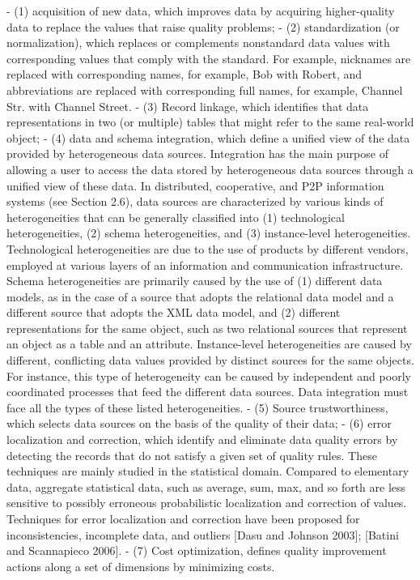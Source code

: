 \documentclass[pdftex,english,oribibl]{llncs}
\begin{document}
    - (1) acquisition of new data, which improves data by acquiring higher-quality data to replace the values that raise quality problems;
    - (2) standardization (or normalization), which replaces or complements nonstandard data values with corresponding values that comply with the standard. For example, nicknames are replaced with corresponding names, for example, Bob with Robert, and abbreviations are replaced with corresponding full names, for example, Channel Str. with Channel Street.
    - (3) Record linkage, which identifies that data representations in two (or multiple) tables that might refer to the same real-world object;
    - (4) data and schema integration, which define a unified view of the data provided by heterogeneous data sources. Integration has the main purpose of allowing a user to access the data stored by heterogeneous data sources through a unified view of these data. In distributed, cooperative, and P2P information systems (see Section 2.6), data sources are characterized by various kinds of heterogeneities that can be generally classified into (1) technological heterogeneities, (2) schema heterogeneities, and (3) instance-level heterogeneities. Technological heterogeneities are due to the use of products by different vendors, employed at various layers of an information and communication infrastructure. Schema heterogeneities are primarily caused by the use of (1) different data models, as in the case of a source that adopts the relational data model and a different source that adopts the XML data model, and (2) different representations for the same object, such as two relational sources that represent an object as a table and an attribute. Instance-level heterogeneities are caused by different, conflicting data values provided by distinct sources for the same objects. For instance, this type of heterogeneity can be caused by independent and poorly coordinated processes that feed the different data sources. Data integration must face all the types of these listed heterogeneities.
    - (5) Source trustworthiness, which selects data sources on the basis of the quality of their data;
    - (6) error localization and correction, which identify and eliminate data quality errors by detecting the records that do not satisfy a given set of quality rules. These techniques are mainly studied in the statistical domain. Compared to elementary data, aggregate statistical data, such as average, sum, max, and so forth are less sensitive to possibly erroneous probabilistic localization and correction of values. Techniques for error localization and correction have been proposed for inconsistencies, incomplete data, and outliers [Dasu and Johnson 2003]; [Batini and Scannapieco 2006].
    - (7) Cost optimization, defines quality improvement actions along a set of dimensions by minimizing costs.
\end{document}
